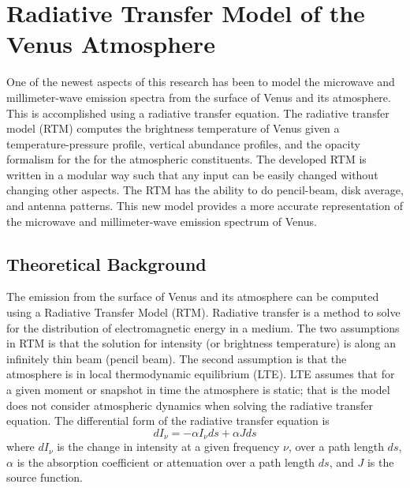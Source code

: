 \chapter{Radiative Transfer Model of the Venus Atmosphere}


One of the newest aspects of this research has been to model the microwave and millimeter-wave emission spectra from the surface of Venus and its atmosphere. This is accomplished using a radiative transfer equation. The radiative transfer model (RTM) computes the brightness temperature of Venus given a temperature-pressure profile, vertical abundance profiles, and the opacity formalism for the for the atmospheric constituents. The developed RTM is written in a modular way such that any input can be easily changed without changing other aspects. The RTM has the ability to do pencil-beam, disk average, and antenna patterns. This new model provides a more accurate representation of the microwave and millimeter-wave emission spectrum of Venus. 

\section{Theoretical Background}

The emission from the surface of Venus and its atmosphere can be computed using a Radiative Transfer Model (RTM). Radiative transfer is a method to solve for the distribution of electromagnetic energy in a medium. The two assumptions in RTM is that the solution for intensity (or brightness temperature) is along an infinitely thin beam (pencil beam). The second assumption is that the atmosphere is in local thermodynamic equilibrium (LTE). LTE assumes that for a given moment or snapshot in time the atmosphere is static; that is the model does not consider atmospheric dynamics when solving the radiative transfer equation. The differential form of the radiative transfer equation is
\begin{equation}\label{eq:rtm-diff}
dI_{\nu}= -\alpha I_{\nu }ds + \alpha J ds
\end{equation}
where $dI_\nu$ is the change in intensity at a given frequency $\nu$, over a path length $ds$, $\alpha$ is the absorption coefficient or attenuation over a path length $ds$, and $J$ is the source function\cite{Liou-2002}. 

